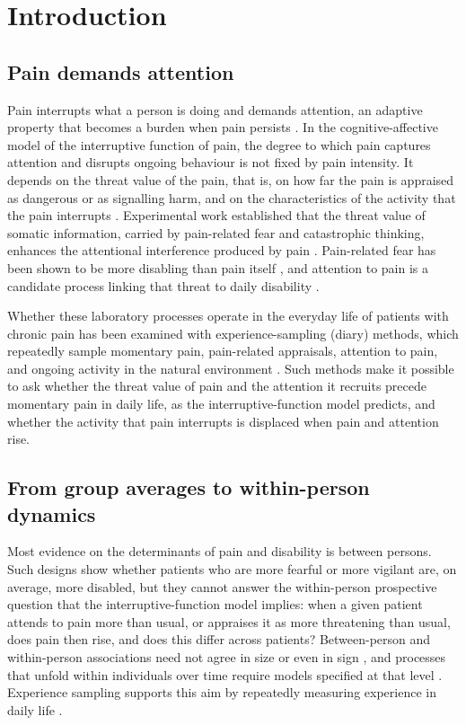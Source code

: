 \documentclass[11pt,a4paper]{article}
\begin{document}
\section{Introduction}

\subsection{Pain demands attention}
Pain interrupts what a person is doing and demands attention, an adaptive property that becomes
a burden when pain persists \citep{eccleston1999pain}. In the cognitive-affective model of the
interruptive function of pain, the degree to which pain captures attention and disrupts ongoing
behaviour is not fixed by pain intensity. It depends on the threat value of the pain, that is,
on how far the pain is appraised as dangerous or as signalling harm, and on the characteristics
of the activity that the pain interrupts \citep{eccleston1999pain,eccleston2007worry}.
Experimental work established that the threat value of somatic information, carried by
pain-related fear and catastrophic thinking, enhances the attentional interference produced by
pain \citep{crombez1998catastrophizing,crombez1999fear,crombez2013attention}. Pain-related fear
has been shown to be more disabling than pain itself \citep{crombez1999fear}, and attention to
pain is a candidate process linking that threat to daily disability
\citep{vandamme2010keeping}.

Whether these laboratory processes operate in the everyday life of patients with chronic pain has
been examined with experience-sampling (diary) methods, which repeatedly sample momentary pain,
pain-related appraisals, attention to pain, and ongoing activity in the natural environment
\citep{tennen1996daily,peters2000electronic}. Such methods make it possible to ask whether the
threat value of pain and the attention it recruits precede momentary pain in daily life, as the
interruptive-function model predicts, and whether the activity that pain interrupts is displaced
when pain and attention rise.

\subsection{From group averages to within-person dynamics}
Most evidence on the determinants of pain and disability is between persons. Such designs show
whether patients who are more fearful or more vigilant are, on average, more disabled, but they
cannot answer the within-person prospective question that the interruptive-function model
implies: when a given patient attends to pain more than usual, or appraises it as more
threatening than usual, does pain then rise, and does this differ across patients? Between-person
and within-person associations need not agree in size or even in sign
\citep{curran2011disaggregation,fisher2018lack}, and processes that unfold within individuals
over time require models specified at that level
\citep{molenaar2004manifesto,hamaker2017no,wright2020personalized}. Experience sampling supports
this aim by repeatedly measuring experience in daily life
\citep{myingermeys2018experience,shiffman2008ecological,stone1998strategies}.
\end{document}
